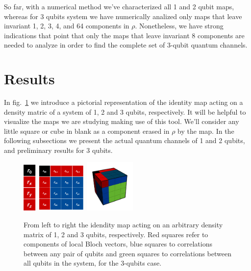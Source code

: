 \documentclass[11pt,dvipsnames]{article} %
\newcommand{\fref}[1]{fig.~\ref{#1}}  \newcommand{\tref}[1]{table~\ref{#1}}
\newcommand{\1}{\mathds{1}}
\begin{document}
So far, with a numerical method we've characterized all 1 and 2 qubit maps, 
whereas for 3 qubits system we have numerically analized only maps that leave 
invariant 1, 2, 3, 4, and 64 components in $\rho$. Nonetheless, we have strong
indications that point that only the maps that leave invariant 8 components are 
needed to analyze in order to find the complete set of 3-qubit quantum 
channels.
\section*{Results} %
In \fref{fig:pictorial-rep-rho} we introduce a pictorial representation 
of the identity map acting on a density matric of a system of 1, 2 and 3 qubits,
respectively. It will be helpful to visualize the maps we are studying 
making use of this tool. We'll consider any little square or cube in blank
as a component erased in $\rho$ by the map. 
In the following subsections we present the actual quantum channels of
1 and 2 qubits, and preliminary results for 3 qubits.
\begin{figure}[H] %
	\centering
	\hfill \hfill
	\includegraphics[height=2.5cm]
	{img/tablero-1q}
	\hfill
	\includegraphics[width=2.5cm]
	{img/rho2q(2)}
	\hfill 
	\includegraphics[width=2.5cm]
	{img/rho-3q}
	\hfill \hfill
	\caption{From left to right the idendity map acting on
  an arbitrary density matrix of 1, 2 and 3 qubits, respectively. 
	Red squares refer to components of local Bloch vectors,
	blue squares to correlations between any pair of qubits and
	green squares to correlations between all qubits in the system, for
	the 3-qubits case.}
	\label{fig:pictorial-rep-rho}
\end{figure} %
\end{document}
